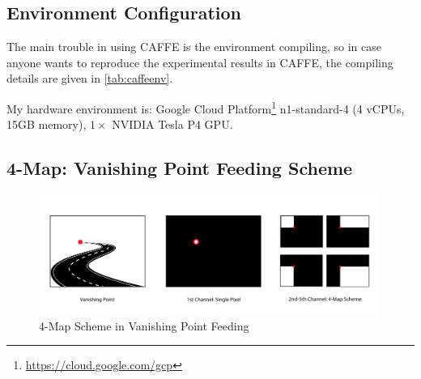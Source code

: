 \begin{spacing}{1.5}
\subsection{Environment Configuration}

\begin{table}[ht]
\centering
\caption{Dependency Environment of CAFFE v1.0}
\label{tab:caffeenv}
\end{table}

The main trouble in using CAFFE is the environment compiling, so in case anyone wants to reproduce the experimental results in CAFFE, the compiling details are given in \autoref{tab:caffeenv}.

My hardware environment is: Google Cloud Platform\footnote{\url{https://cloud.google.com/gcp}} n1-standard-4 (4 vCPUs, 15GB memory), $1 \times$ NVIDIA Tesla P4 GPU.

\subsection{4-Map: Vanishing Point Feeding Scheme}
\label{subsec:fourmap}

\begin{figure}[ht]
\centering
\includegraphics[width=0.99\textwidth, fbox]{Chapter3/fourmap.pdf}
\caption{4-Map Scheme in Vanishing Point Feeding}
\label{fig:fourmap} 
\end{figure}



\end{spacing}
